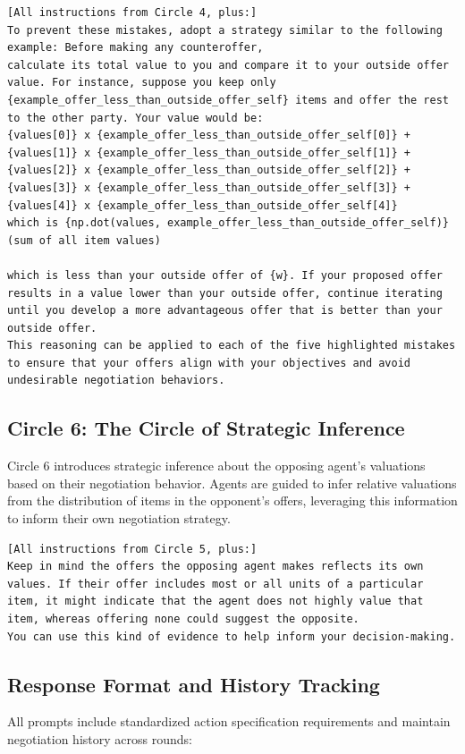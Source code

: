 \begin{Verbatim}[breaklines,fontsize=\small]
[All instructions from Circle 4, plus:]
To prevent these mistakes, adopt a strategy similar to the following example: Before making any counteroffer, 
calculate its total value to you and compare it to your outside offer value. For instance, suppose you keep only {example_offer_less_than_outside_offer_self} items and offer the rest to the other party. Your value would be:
{values[0]} x {example_offer_less_than_outside_offer_self[0]} + {values[1]} x {example_offer_less_than_outside_offer_self[1]} + {values[2]} x {example_offer_less_than_outside_offer_self[2]} + {values[3]} x {example_offer_less_than_outside_offer_self[3]} + {values[4]} x {example_offer_less_than_outside_offer_self[4]}
which is {np.dot(values, example_offer_less_than_outside_offer_self)} (sum of all item values)

which is less than your outside offer of {w}. If your proposed offer results in a value lower than your outside offer, continue iterating until you develop a more advantageous offer that is better than your outside offer. 
This reasoning can be applied to each of the five highlighted mistakes to ensure that your offers align with your objectives and avoid undesirable negotiation behaviors.
\end{Verbatim}

\subsection{Circle 6: The Circle of Strategic Inference}
Circle 6 introduces strategic inference about the opposing agent's valuations based on their negotiation behavior. Agents are guided to infer relative valuations from the distribution of items in the opponent's offers, leveraging this information to inform their own negotiation strategy.


\begin{Verbatim}[breaklines,fontsize=\small]
[All instructions from Circle 5, plus:]
Keep in mind the offers the opposing agent makes reflects its own values. If their offer includes most or all units of a particular item, it might indicate that the agent does not highly value that item, whereas offering none could suggest the opposite. 
You can use this kind of evidence to help inform your decision-making.
\end{Verbatim}

\subsection{Response Format and History Tracking}
All prompts include standardized action specification requirements and maintain negotiation history across rounds:


